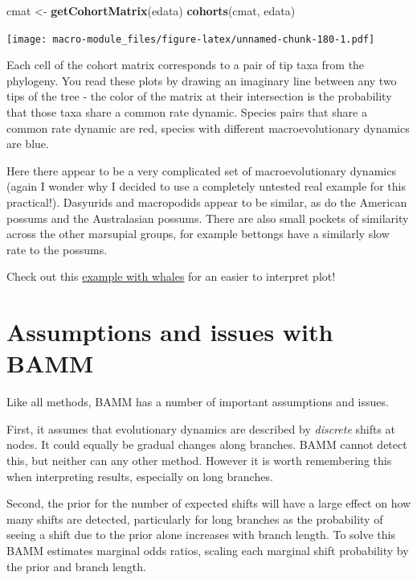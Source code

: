 \documentclass[]{book}
\newenvironment{Shaded}{\begin{snugshade}}{\end{snugshade}}
\newcommand{\KeywordTok}[1]{\textcolor[rgb]{0.13,0.29,0.53}{\textbf{{#1}}}}
\newcommand{\StringTok}[1]{\textcolor[rgb]{0.31,0.60,0.02}{{#1}}}
\newcommand{\NormalTok}[1]{{#1}}
\begin{document}
\begin{Shaded}
\begin{Highlighting}[]
\NormalTok{cmat <-}\StringTok{ }\KeywordTok{getCohortMatrix}\NormalTok{(edata)}
\KeywordTok{cohorts}\NormalTok{(cmat, edata)}
\end{Highlighting}
\end{Shaded}

\texttt{[image: macro-module\_files/figure-latex/unnamed-chunk-180-1.pdf]}

Each cell of the cohort matrix corresponds to a pair of tip taxa from
the phylogeny. You read these plots by drawing an imaginary line between
any two tips of the tree - the color of the matrix at their intersection
is the probability that those taxa share a common rate dynamic. Species
pairs that share a common rate dynamic are red, species with different
macroevolutionary dynamics are blue.

Here there appear to be a very complicated set of macroevolutionary
dynamics (again I wonder why I decided to use a completely untested real
example for this practical!). Dasyurids and macropodids appear to be
similar, as do the American possums and the Australasian possums. There
are also small pockets of similarity across the other marsupial groups,
for example bettongs have a similarly slow rate to the possums.

Check out this
\href{http://bamm-project.org/bammgraph.html\#whales-cohort}{example
with whales} for an easier to interpret plot!

\section{Assumptions and issues with
BAMM}\label{assumptions-and-issues-with-bamm}

Like all methods, BAMM has a number of important assumptions and issues.

First, it assumes that evolutionary dynamics are described by
\emph{discrete} shifts at nodes. It could equally be gradual changes
along branches. BAMM cannot detect this, but neither can any other
method. However it is worth remembering this when interpreting results,
especially on long branches.

Second, the prior for the number of expected shifts will have a large
effect on how many shifts are detected, particularly for long branches
as the probability of seeing a shift due to the prior alone increases
with branch length. To solve this BAMM estimates marginal odds ratios,
scaling each marginal shift probability by the prior and branch length.
\end{document}
